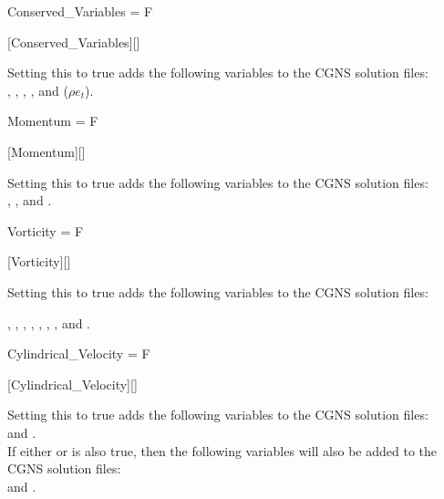 \begin{nmldescitem}
Conserved_Variables = F
\end{nmldescitem}
[Conserved\_Variables][]

\begin{nmldescbody}
Setting this to true adds the following variables to the CGNS solution files:
\\
  ,
  ,
  ,
  , and
   (\thatis $\rho e_t$).
\end{nmldescbody}


\begin{nmldescitem}
Momentum = F
\end{nmldescitem}
[Momentum][]

\begin{nmldescbody}
Setting this to true adds the following variables to the CGNS solution files:
\\
  ,
  , and
  .
\end{nmldescbody}


\begin{nmldescitem}
Vorticity = F
\end{nmldescitem}
[Vorticity][]

\begin{nmldescbody}
Setting this to true adds the following variables to the CGNS solution files:
\\\raggedright
  ,
  ,
  ,
  ,
  ,
  ,
  , and
  .
\end{nmldescbody}


\begin{nmldescitem}
Cylindrical_Velocity = F
\end{nmldescitem}
[Cylindrical\_Velocity][]

\begin{nmldescbody}
Setting this to true adds the following variables to the CGNS solution files:
\\
   and
  .
\\
If either
 or
is also true, then
the following variables will also be added to the CGNS solution files:
\\
   and
  .
\end{nmldescbody}

